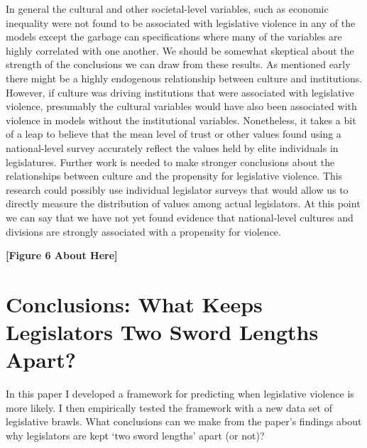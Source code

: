 \documentclass[a4paper]{article}\usepackage{graphicx, color}
\begin{document}
{{In general the cultural and other societal-level variables, such as economic inequality were not found to be associated with legislative violence in any of the models except the garbage can specifications where many of the variables are highly correlated with one another. We should be somewhat skeptical about the strength of the conclusions we can draw from these results. As mentioned early there might be a highly endogenous relationship between culture and institutions. However, if culture was driving institutions that were associated with legislative violence, presumably the cultural variables would have also been associated with violence in models without the institutional variables. Nonetheless, it takes a bit of a leap to believe that the mean level of trust or other values found using a national-level survey accurately reflect the values held by elite individuals in legislatures. Further work is needed to make stronger conclusions about the relationships between culture and the propensity for legislative violence. This research could possibly use individual legislator surveys that would allow us to directly measure the distribution of values among actual legislators. At this point we can say that we have not yet found evidence that national-level cultures and divisions are strongly associated with a propensity for violence.  

\begin{center}

    {\bf{[Figure 6 About Here]}}

\end{center}

\section*{Conclusions: What Keeps Legislators Two Sword Lengths Apart?}

In this paper I developed a framework for predicting when legislative violence is more likely. I then empirically tested the framework with a new data set of legislative brawls. What conclusions can we make from the paper's findings about why legislators are kept `two sword lengths' apart (or not)?

}}
\end{document}
